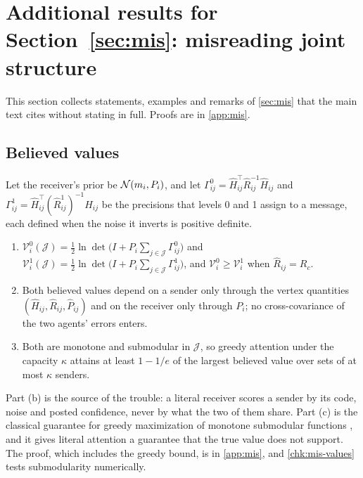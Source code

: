 \section{Additional results for \texorpdfstring{Section~\ref{sec:mis}}{Section 3}: misreading joint structure}\label{sup:mis}

This section collects statements, examples and remarks of \cref{sec:mis} that the main text cites without stating in full. Proofs are in \cref{app:mis}.

\subsection{Believed values}\label{sup:mis-believed-values}

\begin{proposition}\label{prop:mis-believed-values}
Let the receiver's prior be $\mathcal{N}(m_i,P_i)$, and let $\Gamma^0_{ij}=\hat H_{ij}^\top\hat R_{ij}^{-1}\hat H_{ij}$ and $\Gamma^1_{ij}=\hat H_{ij}^\top(\hat R^1_{ij})^{-1}\hat H_{ij}$ be the precisions that levels 0 and 1 assign to a message, each defined when the noise it inverts is positive definite.
\begin{enumerate}
\item[(a)] $\mathcal V^0_i(\mathcal J)=\tfrac12\ln\det\bigl(I+P_i\sum_{j\in\mathcal J}\Gamma^0_{ij}\bigr)$ and $\mathcal V^1_i(\mathcal J)=\tfrac12\ln\det\bigl(I+P_i\sum_{j\in\mathcal J}\Gamma^1_{ij}\bigr)$, and $\mathcal V^0_i\ge\mathcal V^1_i$ when $\hat R_{ij}=R_c$.
\item[(b)] Both believed values depend on a sender only through the vertex quantities $(\hat H_{ij},\hat R_{ij},\hat P_{ij})$ and on the receiver only through $P_i$; no cross-covariance of the two agents' errors enters.
\item[(c)] Both are monotone and submodular in $\mathcal J$, so greedy attention under the capacity $\kappa$ attains at least $1-1/e$ of the largest believed value over sets of at most $\kappa$ senders.
\end{enumerate}
\end{proposition}

Part (b) is the source of the trouble: a literal receiver scores a sender by its code, noise and posted confidence, never by what the two of them share. Part (c) is the classical guarantee for greedy maximization of monotone submodular functions \citep{nemhauser1978analysis}, and it gives literal attention a guarantee that the true value does not support. The proof, which includes the greedy bound, is in \cref{app:mis}, and \cref{chk:mis-values} tests submodularity numerically.

